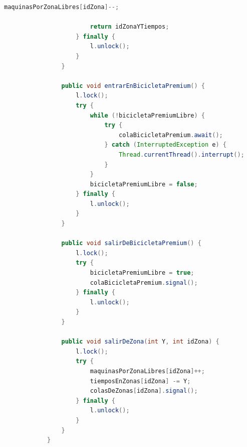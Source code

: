 \documentclass[a4paper,12pt,titlepage,oneside]{article}
\begin{document}
\begin{lstlisting}[language=Java, title={MonitorZonasGimnasio}]
                        maquinasPorZonaLibres[idZona]--;

                        return idZonaYTiempos;
                    } finally {
                        l.unlock();
                    }
                }

                public void entrarEnBicicletaPremium() {
                    l.lock();
                    try {
                        while (!bicicletaPremiumLibre) {
                            try {
                                colaBicicletaPremium.await();
                            } catch (InterruptedException e) {
                                Thread.currentThread().interrupt();
                            }
                        }
                        bicicletaPremiumLibre = false;
                    } finally {
                        l.unlock();
                    }
                }

                public void salirDeBicicletaPremium() {
                    l.lock();
                    try {
                        bicicletaPremiumLibre = true;
                        colaBicicletaPremium.signal();
                    } finally {
                        l.unlock();
                    }
                }

                public void salirDeZona(int Y, int idZona) {
                    l.lock();
                    try {
                        maquinasPorZonaLibres[idZona]++;
                        tiemposEnZonas[idZona] -= Y;
                        colasDeZonas[idZona].signal();
                    } finally {
                        l.unlock();
                    }
                }
            }
        \end{lstlisting}
\end{document}
